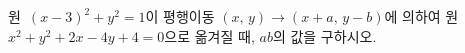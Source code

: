 원~$(x-3)^2+y^2=1$이 평행이동 $(x,\,y)\longrightarrow(x+a,\,y-b)$에 의하여 원~$x^2+y^2+2x-4y+4=0$으로 옮겨질 때, $ab$의 값을 구하시오.
